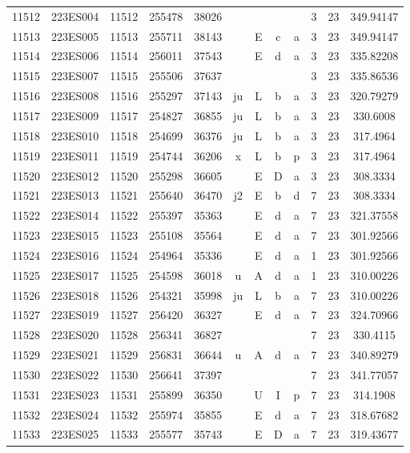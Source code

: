 \begin{tabular}{|*{12}{c|}}
11512 & 223ES004 & 11512 & 255478 & 38026 &  &  &  &  & 3 & 23 & 349.94147 \\ 
11513 & 223ES005 & 11513 & 255711 & 38143 &  & E & c & a & 3 & 23 & 349.94147 \\ 
11514 & 223ES006 & 11514 & 256011 & 37543 &  & E & d & a & 3 & 23 & 335.82208 \\ 
11515 & 223ES007 & 11515 & 255506 & 37637 &  &  &  &  & 3 & 23 & 335.86536 \\ 
11516 & 223ES008 & 11516 & 255297 & 37143 & ju & L & b & a & 3 & 23 & 320.79279 \\ 
11517 & 223ES009 & 11517 & 254827 & 36855 & ju & L & b & a & 3 & 23 & 330.6008 \\ 
11518 & 223ES010 & 11518 & 254699 & 36376 & ju & L & b & a & 3 & 23 & 317.4964 \\ 
11519 & 223ES011 & 11519 & 254744 & 36206 & x & L & b & p & 3 & 23 & 317.4964 \\ 
11520 & 223ES012 & 11520 & 255298 & 36605 &  & E & D & a & 3 & 23 & 308.3334 \\ 
11521 & 223ES013 & 11521 & 255640 & 36470 & j2 & E & b & d & 7 & 23 & 308.3334 \\ 
11522 & 223ES014 & 11522 & 255397 & 35363 &  & E & d & a & 7 & 23 & 321.37558 \\ 
11523 & 223ES015 & 11523 & 255108 & 35564 &  & E & d & a & 7 & 23 & 301.92566 \\ 
11524 & 223ES016 & 11524 & 254964 & 35336 &  & E & d & a & 1 & 23 & 301.92566 \\ 
11525 & 223ES017 & 11525 & 254598 & 36018 & u & A & d & a & 1 & 23 & 310.00226 \\ 
11526 & 223ES018 & 11526 & 254321 & 35998 & ju & L & b & a & 7 & 23 & 310.00226 \\ 
11527 & 223ES019 & 11527 & 256420 & 36327 &  & E & d & a & 7 & 23 & 324.70966 \\ 
11528 & 223ES020 & 11528 & 256341 & 36827 &  &  &  &  & 7 & 23 & 330.4115 \\ 
11529 & 223ES021 & 11529 & 256831 & 36644 & u & A & d & a & 7 & 23 & 340.89279 \\ 
11530 & 223ES022 & 11530 & 256641 & 37397 &  &  &  &  & 7 & 23 & 341.77057 \\ 
11531 & 223ES023 & 11531 & 255899 & 36350 &  & U & I & p & 7 & 23 & 314.1908 \\ 
11532 & 223ES024 & 11532 & 255974 & 35855 &  & E & d & a & 7 & 23 & 318.67682 \\ 
11533 & 223ES025 & 11533 & 255577 & 35743 &  & E & D & a & 7 & 23 & 319.43677 \\ 

\end{tabular}
